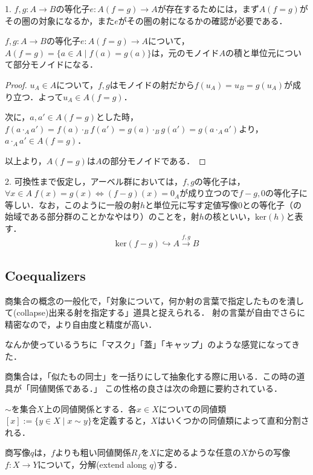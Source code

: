 \documentclass[uplatex, 12pt, dvipdfmx]{jsarticle}
\begin{document}
\begin{example}
    1. $f,g:A\to B$の等化子$e:A(f=g)\to A$が存在するためには，まず$A(f=g)$がその圏の対象になるか，また$e$がその圏の射になるかの確認が必要である．

    \begin{proposition*}[Monでの等化子]
        $f,g:A\to B$の等化子$e:A(f=g)\to A$について，$A(f=g)=\{ a\in A\mid f(a)=g(a) \}$は，元のモノイド$A$の積と単位元について部分モノイドになる．
    \end{proposition*}
    \begin{proof}
        $u_A\in A$について，$f,g$はモノイドの射だから$f(u_A)=u_B=g(u_A)$が成り立つ．よって$u_A\in A(f=g)$．
        
        次に，$a,a'\in A(f=g)$とした時，$f(a\cdot_A a')=f(a)\cdot_B f(a')=g(a)\cdot_B g(a')=g(a\cdot_A a')$より，$a\cdot_Aa'\in A(f=g)$．

        以上より，$A(f=g)$は$A$の部分モノイドである．
    \end{proof}

    2. 可換性まで仮定し，アーベル群においては，$f,g$の等化子は，$\forall x\in A\; f(x)=g(x)\Leftrightarrow (f-g)(x)=0_A$が成り立つので$f-g,0$の等化子に等しい．なお，このように一般の射$h$と単位元に写す定値写像$0$との等化子（の始域である部分群のことかなやはり）のことを，射$h$の核といい，$\mathrm{ker}(h)$と表す．
    \[ \mathrm{ker}(f-g) \hookrightarrow A \xrightarrow{f,g} B \]
\end{example}

\subsection{Coequalizers}
商集合の概念の一般化で，「対象について，何か射の言葉で指定したものを潰して(collapse)出来る射を指定する」道具と捉えられる．
射の言葉が自由でさらに精密なので，より自由度と精度が高い．

なんか使っているうちに「マスク」「蓋」「キャップ」のような感覚になってきた．

商集合は，「似たもの同士」を一括りにして抽象化する際に用いる．この時の道具が「同値関係である．」
この性格の良さは次の命題に要約されている．
\begin{proposition*}
    $\sim$を集合$X$上の同値関係とする．各$x\in X$についての同値類$[x]:=\{ y\in X\mid x\sim y \}$を定義すると，$X$はいくつかの同値類によって直和分割される．
\end{proposition*}
\begin{remark*}商写像$q$は，$f$よりも粗い同値関係$R_f$を$X$に定めるような任意の$X$からの写像$f:X\to Y$について，分解(extend along $q$)する．
    \begin{center}
    \end{center}
\end{remark*}
\end{document}
